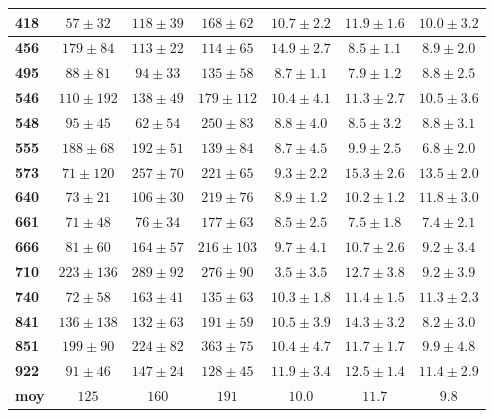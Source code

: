 \begin{appendices}
\begin{tabular}{|l|c|c|c|c|c|c|}
		\textbf{418}&$57 \pm 32$&$118 \pm 39$&$168 \pm 62$&$10.7 \pm 2.2$&$11.9 \pm 1.6$&$10.0 \pm 3.2$\\\hline
		\textbf{456}&$179 \pm 84$&$113 \pm 22$&$114 \pm 65$&$14.9 \pm 2.7$&$8.5 \pm 1.1$&$8.9 \pm 2.0$\\\hline
		\textbf{495}&$88 \pm 81$&$94 \pm 33$&$135 \pm 58$&$8.7 \pm 1.1$&$7.9 \pm 1.2$&$8.8 \pm 2.5$\\\hline
		\textbf{546}&$110 \pm 192$&$138 \pm 49$&$179 \pm 112$&$10.4 \pm 4.1$&$11.3 \pm 2.7$&$10.5 \pm 3.6$\\\hline
		\textbf{548}&$95 \pm 45$&$62 \pm 54$&$250 \pm 83$&$8.8 \pm 4.0$&$8.5 \pm 3.2$&$8.8 \pm 3.1$\\\hline
		\textbf{555}&$188 \pm 68$&$192 \pm 51$&$139 \pm 84$&$8.7 \pm 4.5$&$9.9 \pm 2.5$&$6.8 \pm 2.0$\\\hline
		\textbf{573}&$71 \pm 120$&$257 \pm 70$&$221 \pm 65$&$9.3 \pm 2.2$&$15.3 \pm 2.6$&$13.5 \pm 2.0$\\\hline
		\textbf{640}&$73 \pm 21$&$106 \pm 30$&$219 \pm 76$&$8.9 \pm 1.2$&$10.2 \pm 1.2$&$11.8 \pm 3.0$\\\hline
		\textbf{661}&$71 \pm 48$&$76 \pm 34$&$177 \pm 63$&$8.5 \pm 2.5$&$7.5 \pm 1.8$&$7.4 \pm 2.1$\\\hline
		\textbf{666}&$81 \pm 60$&$164 \pm 57$&$216 \pm 103$&$9.7 \pm 4.1$&$10.7 \pm 2.6$&$9.2 \pm 3.4$\\\hline
		\textbf{710}&$223 \pm 136$&$289 \pm 92$&$276 \pm 90$&$3.5 \pm 3.5$&$12.7 \pm 3.8$&$9.2 \pm 3.9$\\\hline
		\textbf{740}&$72 \pm 58$&$163 \pm 41$&$135 \pm 63$&$10.3 \pm 1.8$&$11.4 \pm 1.5$&$11.3 \pm 2.3$\\\hline
		\textbf{841}&$136 \pm 138$&$132 \pm 63$&$191 \pm 59$&$10.5 \pm 3.9$&$14.3 \pm 3.2$&$8.2 \pm 3.0$\\\hline
		\textbf{851}&$199 \pm 90$&$224 \pm 82$&$363 \pm 75$&$10.4 \pm 4.7$&$11.7 \pm 1.7$&$9.9 \pm 4.8$\\\hline
		\textbf{922}&$91 \pm 46$&$147 \pm 24$&$128 \pm 45$&$11.9 \pm 3.4$&$12.5 \pm 1.4$&$11.4 \pm 2.9$\\\hline
		\textbf{moy}&$125$&$160$&$191$&$10.0$&$11.7$&$9.8$\\\hline
	\end{tabular}
	

\end{appendices}

